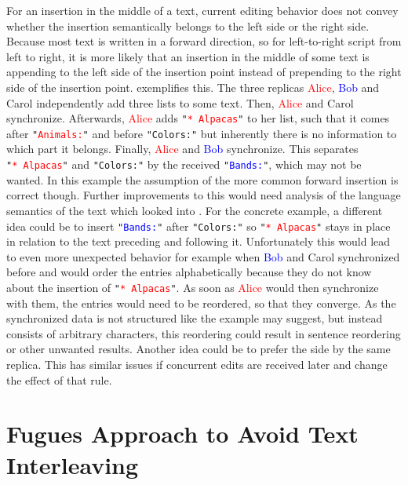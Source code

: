 For an insertion in the middle of a text, current editing behavior does not convey whether the insertion semantically belongs to the left side or the right side. Because most text is written in a forward direction, so for left-to-right script from left to right, it is more likely that an insertion in the middle of some text is appending to the left side of the insertion point instead of prepending to the right side of the insertion point.  exemplifies this. The three replicas \textcolor{red}{Alice}, \textcolor{blue}{Bob} and \textcolor{mygreen}{Carol} independently add three lists to some text. Then, \textcolor{red}{Alice} and \textcolor{mygreen}{Carol} synchronize. Afterwards, \textcolor{red}{Alice} adds \texttt{"\textcolor{red}{*~Alpacas}"} to her list, such that it comes after \texttt{"\textcolor{red}{Animals:}"} and before \texttt{"\textcolor{mygreen}{Colors:}"} but inherently there is no information to which part it belongs. Finally, \textcolor{red}{Alice} and \textcolor{blue}{Bob} synchronize. This separates \texttt{"\textcolor{red}{*~Alpacas}"} and \texttt{"\textcolor{mygreen}{Colors:}"} by the received \texttt{"\textcolor{blue}{Bands:}"}, which may not be wanted. In this example the assumption of the more common forward insertion is correct though. Further improvements to this would need analysis of the language semantics of the text which  looked into \cite{2023-bauwens-nlp-for-merging}. For the concrete example, a different idea could be to insert \texttt{"\textcolor{blue}{Bands:}"} after \texttt{"\textcolor{mygreen}{Colors:}"} so \texttt{"\textcolor{red}{*~Alpacas}"} stays in place in relation to the text preceding and following it. Unfortunately this would lead to even more unexpected behavior for example when \textcolor{blue}{Bob} and \textcolor{mygreen}{Carol} synchronized before and would order the entries alphabetically because they do not know about the insertion of \texttt{"\textcolor{red}{*~Alpacas}"}. As soon as \textcolor{red}{Alice} would then synchronize with them, the entries would need to be reordered, so that they converge. As the synchronized data is not structured like the example may suggest, but instead consists of arbitrary characters, this reordering could result in sentence reordering or other unwanted results. Another idea could be to prefer the side by the same replica. This has similar issues if concurrent edits are received later and change the effect of that rule.

\section{Fugues Approach to Avoid Text Interleaving} \label{section:challenges-text-interleaving-fugue}

